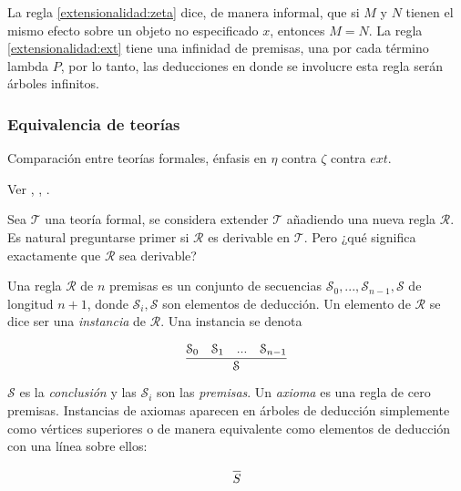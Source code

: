 La regla \eqref{extensionalidad:zeta} dice, de manera informal, que si \( M \) y \( N \) tienen el mismo efecto sobre un objeto no especificado \( x \), entonces \( M = N \). La regla \eqref{extensionalidad:ext} tiene una infinidad de premisas, una por cada término lambda \( P \), por lo tanto, las deducciones en donde se involucre esta regla serán árboles infinitos.

\subsubsection{Equivalencia de teorías}
\label{sec:equivalenciateorias}

Comparación entre teorías formales, énfasis en \( η \) contra \( ζ \) contra \( ext \).

Ver \cite{HindleySeldin:LambdaCalculusAndCombinators}, \cite{Troelstra:ProofTheory}, \cite{Mendelson:Logic}.

Sea \( \mathcal{T} \) una teoría formal, se considera extender \( \mathcal{T} \) añadiendo una nueva regla \( \mathcal{R} \). Es natural preguntarse primer si \( \mathcal{R} \) es derivable en \( \mathcal{T} \). Pero ¿qué significa exactamente que \( \mathcal{R} \) sea derivable?

\begin{defn}[Regla]
  \label{defn:regla}
  Una regla \( \mathcal{R} \) de \( n \) premisas es un conjunto de secuencias \( \mathcal{S}_{0},...,\mathcal{S}_{n-1},\mathcal{S} \) de longitud \( n+1 \), donde \( \mathcal{S}_{i},\mathcal{S} \) son elementos de deducción. Un elemento de \( \mathcal{R} \) se dice ser una \emph{instancia} de \( \mathcal{R} \). Una instancia se denota

  \[ \infer{\mathcal{S}}{\mathcal{S}_{0} & \mathcal{S}_{1} & ... & \mathcal{S}_{n-1}} \]

  \( \mathcal{S} \) es la \emph{conclusión} y las \( \mathcal{S}_{i} \) son las \emph{premisas}. Un \emph{axioma} es una regla de cero premisas. Instancias de axiomas aparecen en árboles de deducción simplemente como vértices superiores o de manera equivalente como elementos de deducción con una línea sobre ellos:

  \[ \infer{S}{} \]
\end{defn}

